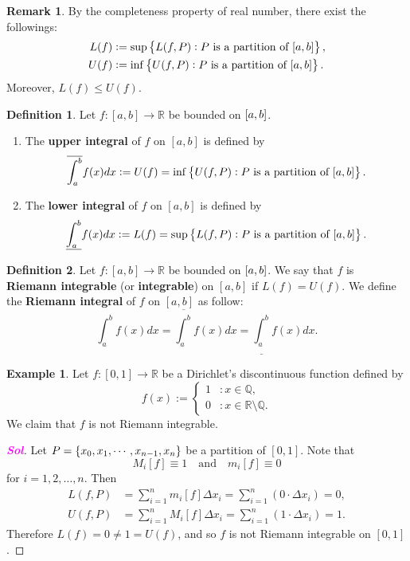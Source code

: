 \documentclass[12pt,openany]{book}
\theoremstyle{definition}
\newtheorem{definition}{Definition}[chapter]
\newtheorem{remark}{Remark}[chapter]
\newtheorem{example}{Example}[chapter]
\newcommand{\Q}{\mathbb{Q}}
\newcommand{\R}{\mathbb{R}}
\newcommand{\sol}{\textcolor{magenta}{\bf Sol}}
\newcommand{\upRiemannint}[2]{
	\overline{\int_{#1}^{#2}}
}
\newcommand{\loRiemannint}[2]{
	\underline{\int_{#1}^{#2}}
}
\begin{document}
	\newpage
	\begin{remark}
		By the completeness property of real number, there exist the followings:
		\begin{align*}
			L(f)&:=\sup\set{L(f,P):\text{$P$ is a partition of $[a,b]$}},\\
			U(f)&:=\inf\set{U(f,P):\text{$P$ is a partition of $[a,b]$}}.
		\end{align*} Moreover, \(L(f)\leq U(f)\).
	\end{remark}

	\begin{tcolorbox}[colframe=defcolor, title={\color{white}\bf Upper and Lower Integral}]
		\begin{definition}
			Let \(f:[a,b]\to\R\) be bounded on \(\sbr{a,b}\).
			\begin{enumerate}[(1)]
				\item The \textbf{upper integral} of \(f\) on \([a,b]\) is defined by \[
				\upRiemannint{a}{b}f(x)dx:=U(f)=\inf\set{U(f,P):\text{$P$ is a partition of $[a,b]$}}.
				\]
				\item The \textbf{lower integral} of \(f\) on \([a,b]\) is defined by \[
				\loRiemannint{a}{b}f(x)dx:=L(f)=\sup\set{L(f,P):\text{$P$ is a partition of $[a,b]$}}.
				\]
			\end{enumerate}
		\end{definition}
	\end{tcolorbox}
	\vspace{8pt}
	\begin{tcolorbox}[colframe=defcolor, title={\color{white}\bf Riemann Integral}]
		\begin{definition}
			Let \(f:[a,b]\to\R\) be bounded on \(\sbr{a,b}\).
			We say that \(f\) is \textbf{Riemann integrable} (or \textbf{integrable}) on \([a,b]\) if \(L(f)=U(f)\). We define the \textbf{Riemann integral} of \(f\) on \([a,b]\) as follow: \[
			\int_a^b f(x)dx =\upRiemannint{a}{b}f(x)dx=\loRiemannint{a}{b}f(x)dx.
			\]
		\end{definition}
	\end{tcolorbox}
	\begin{example}
		Let \(f:[0,1]\to\R\) be a Dirichlet's discontinuous function defined by \[
		f(x):=\begin{cases}
			1 &: x\in\Q,\\
			0 &: x\in\R\setminus\Q.
		\end{cases}
		\] We claim that \(f\) is not Riemann integrable.
		\begin{proof}[\sol]
			Let \(P=\set{x_0,x_1,\cdots,x_{n-1},x_n}\) be a partition of \([0,1]\). Note that \[
			M_i[f]\equiv 1\quad\text{and}\quad m_i[f]\equiv 0
			\] for \(i=1,2,\dots, n\). Then \begin{align*}
				L(f,P)&=\sum_{i=1}^n m_i[f]\Delta x_i=\sum_{i=1}^n(0\cdot\Delta x_i)=0,\\
				U(f,P)&=\sum_{i=1}^n M_i[f]\Delta x_i=\sum_{i=1}^n(1\cdot\Delta x_i)=1.
			\end{align*} Therefore \(L(f)=0\neq 1=U(f)\), and so \(f\) is not Riemann integrable on \([0,1]\).
		\end{proof}
	\end{example}
	
\end{document}
